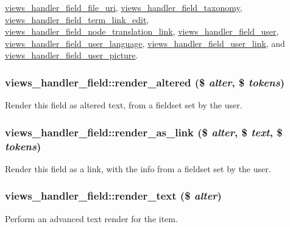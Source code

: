 \hyperlink{classviews__handler__field__file__uri_af0c5416bd2f6c9c2e3cd1b73f7bf1c0f}{views\_\-handler\_\-field\_\-file\_\-uri}, \hyperlink{classviews__handler__field__taxonomy_a02a50e2e97c9faf4e86c5461edf5d547}{views\_\-handler\_\-field\_\-taxonomy}, \hyperlink{classviews__handler__field__term__link__edit_a626104d5ff55d23f8e07f1bec3336b2c}{views\_\-handler\_\-field\_\-term\_\-link\_\-edit}, \hyperlink{classviews__handler__field__node__translation__link_a24fd39ca3d02b69858986ee7ba580d41}{views\_\-handler\_\-field\_\-node\_\-translation\_\-link}, \hyperlink{classviews__handler__field__user_a145dcce889ee17821a1d9c65970d86f2}{views\_\-handler\_\-field\_\-user}, \hyperlink{classviews__handler__field__user__language_aaa89fbb3f01a1dd279f3195eaa837693}{views\_\-handler\_\-field\_\-user\_\-language}, \hyperlink{classviews__handler__field__user__link_af81b37cfa8e0c2363ad8ed9bb601cd14}{views\_\-handler\_\-field\_\-user\_\-link}, and \hyperlink{classviews__handler__field__user__picture_a707edb06f305fa88542f20cbfec36a04}{views\_\-handler\_\-field\_\-user\_\-picture}.\hypertarget{classviews__handler__field_aafbf9e117418a38b937ba670126215a4}{
\subsubsection[{render\_\-altered}]{\setlength{\rightskip}{0pt plus 5cm}views\_\-handler\_\-field::render\_\-altered (\$ {\em alter}, \/  \$ {\em tokens})}}
\label{classviews__handler__field_aafbf9e117418a38b937ba670126215a4}
Render this field as altered text, from a fieldset set by the user. \hypertarget{classviews__handler__field_a44eafd927c2a6d93af234f69e8560078}{
\subsubsection[{render\_\-as\_\-link}]{\setlength{\rightskip}{0pt plus 5cm}views\_\-handler\_\-field::render\_\-as\_\-link (\$ {\em alter}, \/  \$ {\em text}, \/  \$ {\em tokens})}}
\label{classviews__handler__field_a44eafd927c2a6d93af234f69e8560078}
Render this field as a link, with the info from a fieldset set by the user. \hypertarget{classviews__handler__field_a1d6e3f832a9a22410029e79cd9cfc32e}{
\subsubsection[{render\_\-text}]{\setlength{\rightskip}{0pt plus 5cm}views\_\-handler\_\-field::render\_\-text (\$ {\em alter})}}
\label{classviews__handler__field_a1d6e3f832a9a22410029e79cd9cfc32e}
Perform an advanced text render for the item.

